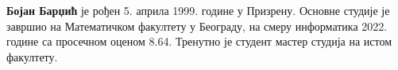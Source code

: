 \documentclass[12pt,oneside]{memoir}
\begin{document}
\backmatter

\begin{biografija}
\textbf{Бојан Барџић} је рођен 5. априла 1999. године у Призрену. Основне студије
је завршио на Математичком факултету у Београду, на смеру информатика 2022. године
са просечном оценом 8.64. Тренутно је студент мастер студија на истом факултету.
\end{biografija}
\end{document}
